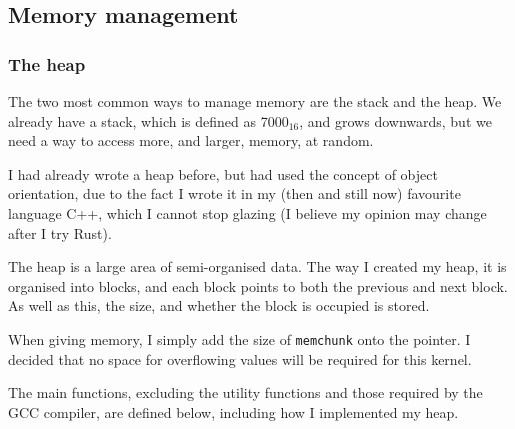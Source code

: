 \documentclass{article}
\begin{document}
\subsection{Memory management}

\subsubsection{The heap}

The two most common ways to manage memory are the stack and the heap.
We already have a stack, which is defined as 7000$_{16}$, and grows downwards,
but we need a way to access more, and larger, memory, at random.

I had already wrote a heap before, but had used the concept of object orientation,
due to the fact I wrote it in my (then and still now) favourite language C++, which
I cannot stop glazing (I believe my opinion may change after I try Rust).

The heap is a large area of semi-organised data. The way I created my heap,
it is organised into blocks, and each block points to both the previous and
next block. As well as this, the size, and whether the block is occupied
is stored.

When giving memory, I simply add the size of \verb|memchunk| onto the pointer.
I decided that no space for overflowing values will be required for this kernel.

The main functions, excluding the utility functions and those required by the
GCC compiler, are defined below, including how I implemented my heap.
\end{document}
